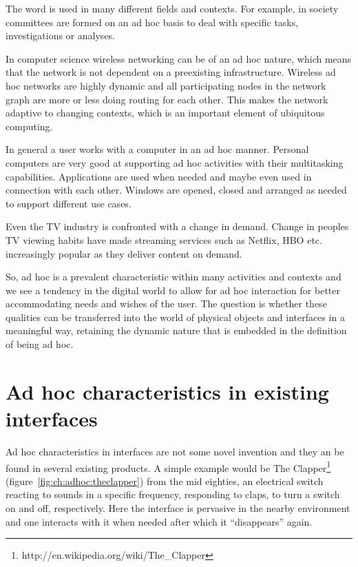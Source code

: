 The word is used in many different fields and contexts.
For example, in society committees are formed on an ad hoc basis to deal with specific tasks, investigations or analyses.

In computer science wireless networking can be of an ad hoc nature, which means that the network is not dependent on a preexisting infrastructure.
Wireless ad hoc networks are highly dynamic and all participating nodes in the network graph are more or less doing routing for each other.
This makes the network adaptive to changing contexts, which is an important element of ubiquitous computing.

In general a user works with a computer in an ad hoc manner.
Personal computers are very good at supporting ad hoc activities with their multitasking capabilities.
Applications are used when needed and maybe even used in connection with each other.
Windows are opened, closed and arranged as needed to support different use cases.

Even the TV industry is confronted with a change in demand.
Change in peoples TV viewing habits have made streaming services such as Netflix, HBO etc. increasingly popular as they deliver content on demand.

So, ad hoc is a prevalent characteristic within many activities and contexts and we see a tendency in the digital world to allow for ad hoc interaction for better accommodating needs and wishes of the user.
The question is whether these qualities can be transferred into the world of physical objects and interfaces in a meaningful way, retaining the dynamic nature that is embedded in the definition of being ad hoc.

\section{Ad hoc characteristics in existing interfaces}
Ad hoc characteristics in interfaces are not some novel invention and they an be found in several existing products.
A simple example would be The Clapper\footnote{http://en.wikipedia.org/wiki/The\_Clapper} (figure~\ref{fig:ch:adhoc:theclapper}) from the mid eighties, an electrical switch reacting to sounds in a specific frequency, responding to claps, to turn a switch on and off, respectively.
Here the interface is pervasive in the nearby environment and one interacts with it when needed after which it ``disappears'' again.

